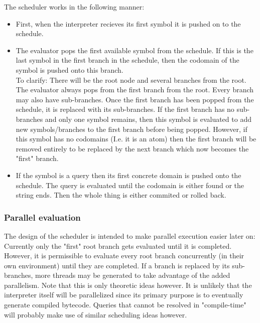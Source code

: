 \documentclass[a4paper,11pt]{article}
\begin{document}
The scheduler works in the following manner:
\begin{itemize}
\item First, when the interpreter recieves its first symbol it is pushed on to the schedule.
\item The evaluator pops the first available symbol from the schedule. If this is the last symbol in the first branch in the schedule, then the codomain of the symbol is pushed onto this branch.\\
To clarify: There will be the root node and several branches from the root. 
The evaluator always pops from the first branch from the root. 
Every branch may also have sub-branches. 
Once the first branch has been popped from the schedule, it is replaced with its sub-branches. 
If the first branch has no sub-branches and only one symbol remains, then this symbol is evaluated to add new symbols/branches to the first branch before being popped.
However, if this symbol has no codomains (I.e. it is an atom) then the first branch will be removed entirely to be replaced by the next branch which now becomes the "first" branch.
\item If the symbol is a query then its first concrete domain is pushed onto the schedule. The query is evaluated until the codomain is either found or the string ends. 
Then the whole thing is either commited or rolled back.
\end{itemize}

\subsubsection{Parallel evaluation}
The design of the scheduler is intended to make parallel execution easier later on: Currently only the "first" root branch gets evaluated until it is completed.
However, it is permissible to evaluate every root branch concurrently (in their own environment) until they are completed. 
If a branch is replaced by its sub-branches, more threads may be generated to take advantage of the added parallelism.
Note that this is only theoretic ideas however. 
It is unlikely that the interpreter itself will be parallelized since its primary purpose is to eventually generate compiled bytecode.
Queries that cannot be resolved in "compile-time" will probably make use of similar scheduling ideas however.
\end{document}
